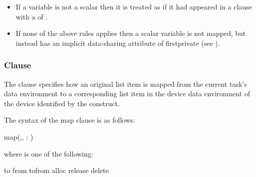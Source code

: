 \begin{itemize}

\item If a variable is not a scalar then it is treated as if it had appeared 
      in a  clause with a  of .


\item If none of the above rules applies then a scalar variable is not
      mapped, but instead has an implicit data-sharing attribute of
      firstprivate (see ).
\end{itemize}



\subsubsection{ Clause}
\label{subsec:map Clause}
\summary
The  clause specifies how an original list item is mapped from the 
current task's data environment to a corresponding list item in the device 
data environment of the device identified by the construct.

\syntax
The syntax of the map clause is as follows:

\begin{ompSyntax}
map(\plc{[ [map-type-modifier[},\plc{] [map-type-modifier[},\plc{] ...] map-type} : \plc{] locator-list})
\end{ompSyntax}

where  is one of the following:

\begin{indentedcodelist}
to
from
tofrom
alloc
release
delete
\end{indentedcodelist}

